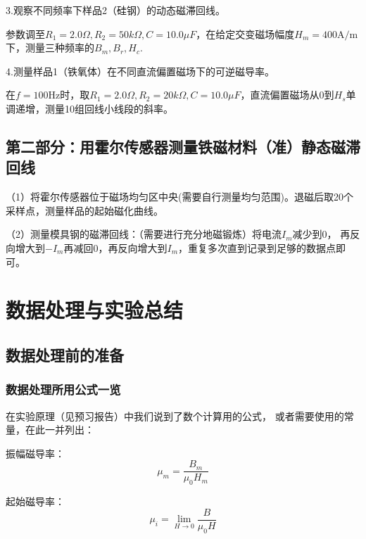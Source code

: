 \documentclass[11pt]{article}
\begin{document}
\medskip
3.观察不同频率下样品2（硅钢）的动态磁滞回线。

参数调至$R_1=2.0\Omega,R_2=50k\Omega,C=10.0\mu F$，在给定交变磁场幅度$H_m=400\text{A}/\text{m}$下，测量三种频率的$B_m,B_r,H_c$.



\medskip
4.测量样品1（铁氧体）在不同直流偏置磁场下的可逆磁导率。

在$f=100\text{Hz}$时，取$R_1=2.0\Omega,R_2=20k\Omega,C=10.0\mu F$，直流偏置磁场从$0$到$H_s$单调递增，测量10组回线小线段的斜率。




\subsection{第二部分：用霍尔传感器测量铁磁材料（准）静态磁滞回线}

（1）将霍尔传感器位于磁场均匀区中央(需要自行测量均匀范围)。退磁后取20个采样点，测量样品的起始磁化曲线。

（2）测量模具钢的磁滞回线：（需要进行充分地磁锻炼）将电流$I_m$减少到0，
再反向增大到$-I_m$再减回0，再反向增大到$I_m$，重复多次直到记录到足够的数据点即可。










\newpage
\section{数据处理与实验总结}

\subsection{数据处理前的准备}

\subsubsection{数据处理所用公式一览}
在实验原理（见预习报告）中我们说到了数个计算用的公式，
或者需要使用的常量，在此一并列出：

振幅磁导率：
\begin{equation*}
    \mu_m = \frac{B_m}{\mu_0H_m}
\end{equation*}

起始磁导率：
\begin{equation*}
    \mu_i = \lim_{H\rightarrow 0}\frac{B}{\mu_{0}H}
\end{equation*}
\end{document}
